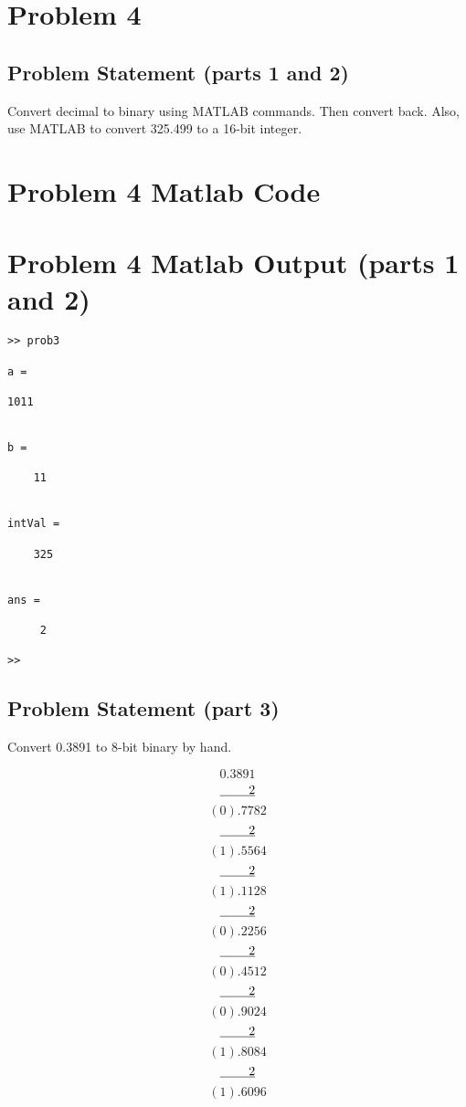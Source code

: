 \documentclass{article}
\begin{document}

\newpage
\section*{Problem 4}
\subsection*{Problem Statement (parts 1 and 2)}

Convert decimal to binary using MATLAB commands. Then convert back. Also, use MATLAB to convert 325.499 to
a 16-bit integer.

\section*{ Problem 4 Matlab Code}


\section*{ Problem 4 Matlab Output (parts 1 and 2)}
\begin{verbatim}
>> prob3

a =

1011


b =

    11


intVal =

    325


ans =

     2

>> 
\end{verbatim}

\subsection*{Problem Statement (part 3)}
Convert 0.3891 to 8-bit binary by hand.

\[ 0.3891 \]
\[ \underline{\hspace{0.8cm}2} \]
\[ (0).7782 \]
\[ \underline{\hspace{0.8cm}2} \]
\[ (1).5564 \]
\[ \underline{\hspace{0.8cm}2} \]
\[ (1).1128 \]
\[ \underline{\hspace{0.8cm}2} \]
\[ (0).2256 \]
\[ \underline{\hspace{0.8cm}2} \]
\[ (0).4512 \]
\[ \underline{\hspace{0.8cm}2} \]
\[ (0).9024 \]
\[ \underline{\hspace{0.8cm}2} \]
\[ (1).8084 \]
\[ \underline{\hspace{0.8cm}2} \]
\[ (1).6096 \]
\end{document}
